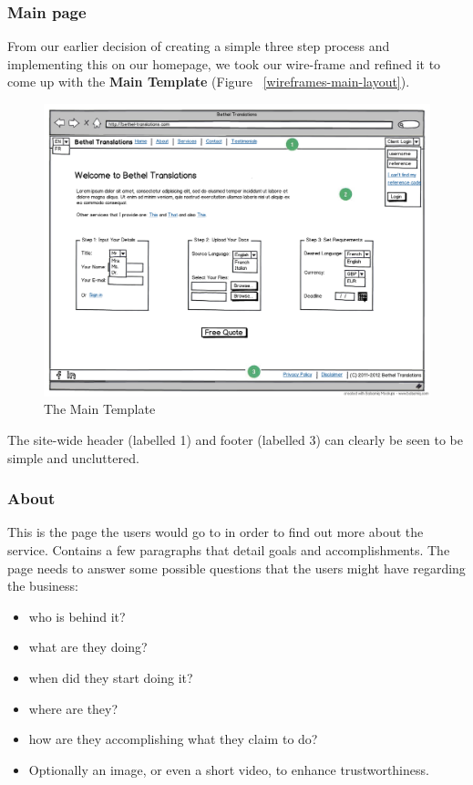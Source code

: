 \documentclass{l3proj}
\begin{document}
\subsubsection{Main page}
From our earlier decision of creating a simple three step process and
implementing this on our homepage, we took our wire-frame and refined it to
come up with the  \textbf{Main Template} (Figure ~\ref{wireframes-main-layout}).

\begin{figure}[ht]
\label{wireframes:main-template}
\begin{center}
\includegraphics[width=\linewidth]{wireframes/bt-homepagev3}
\caption{The Main Template}
\end{center}
\end{figure}

The site-wide header (labelled 1) and footer (labelled 3) can clearly be seen to
be simple and uncluttered.


\subsubsection{About}
This is the page the users would go to in order to find out more about the
service. Contains a few paragraphs that detail goals and accomplishments.
The page needs to answer some possible questions that the users might have
regarding the business:
\begin{itemize}
	\item who is behind it?
	\item what are they doing?
	\item when did they start doing it?
	\item where are they?
	\item how are they accomplishing what they claim to do?
	\item Optionally an image, or even a short video, to enhance trustworthiness.
\end{itemize}
\end{document}
